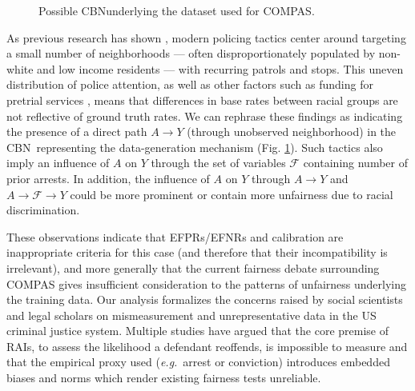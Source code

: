 \documentclass[runningheads]{llncs}
\newcommand{\figref}[1]{Fig. \ref{#1}}
\newcommand{\eg}{\emph{e.g.}}
\newcommand{\CBN}{CBN}
\begin{document}
\begin{figure}
\vskip-0.6cm
\centering
{}
\vspace{-0.3cm}
\caption{Possible \CBN\newline underlying the dataset used for COMPAS.}
\label{fig:CBNCOMPAS}
\end{figure}
\noindent As previous research has shown \cite{isaac17hope,lum16predict,selbst17disparate}, modern policing tactics center around targeting a small number of neighborhoods --- often disproportionately populated by non-white and low income residents --- with recurring patrols and stops. This uneven distribution of police attention, as well as other factors such as funding for pretrial services \cite{koepke17danger,stevenson17assessing}, means that differences in base rates between racial groups are not reflective of ground truth rates. We can rephrase these findings as indicating the presence of a direct path $A\rightarrow Y$ (through unobserved neighborhood) in the \CBN~representing the data-generation mechanism (\figref{fig:CBNCOMPAS}). Such tactics also imply an influence of $A$ on $Y$ through the set of variables ${\mathcal F}$ containing number of prior arrests. In addition, the influence of $A$ on $Y$ through $A\rightarrow Y$ and $A \rightarrow {\mathcal F} \rightarrow Y$ could be more prominent or contain more unfairness due to racial discrimination. 

These observations indicate that EFPRs/EFNRs and calibration are inappropriate criteria for this case (and therefore that their incompatibility is irrelevant), and more generally that the current fairness debate surrounding COMPAS gives insufficient consideration to the patterns of unfairness underlying the training data. Our analysis formalizes the concerns raised by social scientists and legal scholars on mismeasurement and unrepresentative data in the US criminal justice system. Multiple studies \cite{eckhouse18layer,lum17nature,mayson19bias,stevenson17assessing} have argued that the core premise of RAIs, to assess the likelihood a defendant reoffends, is impossible to measure and that the empirical proxy used (\eg~arrest or conviction) introduces embedded biases and norms which render existing fairness tests unreliable.\\
\end{document}
